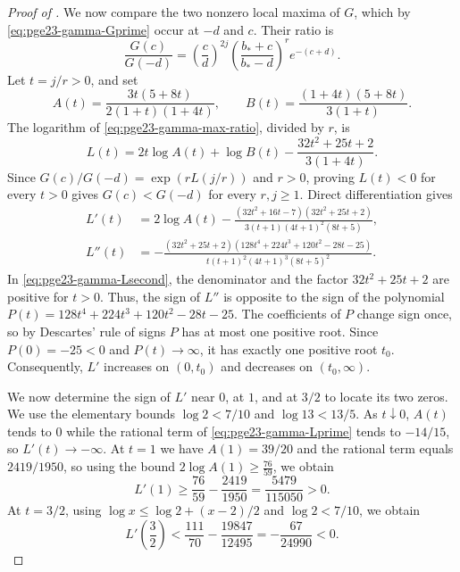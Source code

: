 \documentclass[11pt]{article}
\theoremstyle{remark}
\numberwithin{equation}{section}
\begin{document}
\begin{proof}[Proof of ]
  We now compare the two nonzero local maxima of $G$, which by
  \eqref{eq:pge23-gamma-Gprime} occur at $-d$ and $c$.
  Their ratio is
  \begin{equation}\label{eq:pge23-gamma-max-ratio}
    \frac{G(c)}{G(-d)}
    =\left(\frac {c}{d}\right)^{2j}
    \left(\frac{b_*+c}{b_*-d}\right)^r e^{-(c+d)}.
  \end{equation}
  Let $t=j/r>0$, and set
  \[
    A(t)=\frac{3t(5+8t)}{2(1+t)(1+4t)},
    \qquad
    B(t)=\frac{(1+4t)(5+8t)}{3(1+t)}.
  \]
  The logarithm of \eqref{eq:pge23-gamma-max-ratio}, divided by $r$, is
  \[
    L(t)=2t\log A(t)+\log B(t)
      -\frac{32t^2+25t+2}{3(1+4t)}.
  \]
  Since $G(c)/G(-d)=\exp(rL(j/r))$ and $r>0$, proving $L(t)<0$
  for every $t>0$ gives $G(c)<G(-d)$ for every $r,j\ge1$.
  Direct differentiation gives
  \begin{align}
    L'(t)
    &=2\log A(t)
    -\frac{(32t^2+16t-7)(32t^2+25t+2)}
    {3(t+1)(4t+1)^2(8t+5)},\label{eq:pge23-gamma-Lprime}\\
    L''(t)
    &=-\frac{(32t^2+25t+2)
    (128t^4+224t^3+120t^2-28t-25)}
    {t(t+1)^2(4t+1)^3(8t+5)^2}.
    \label{eq:pge23-gamma-Lsecond}
  \end{align}
  In \eqref{eq:pge23-gamma-Lsecond}, the denominator and the factor
  $32t^2+25t+2$ are positive for $t>0$. Thus, the sign of $L''$ is opposite to the sign of the polynomial
  $P(t)=128t^4+224t^3+120t^2-28t-25$.
  The coefficients of $P$ change sign once, so by Descartes' rule of signs $P$ has at most one positive root.
  Since $P(0)=-25<0$ and $P(t)\to\infty$, it has exactly one positive
  root $t_0$. Consequently, $L'$ increases on $(0,t_0)$ and decreases on
  $(t_0,\infty)$.

  We now determine the sign of $L'$ near $0$, at $1$, and at $3/2$
  to locate its two zeros.
  We use the elementary bounds $\log2<7/10$ and $\log13<13/5$.
  As $t\downarrow0$, $A(t)$ tends to $0$ while the rational term of \eqref{eq:pge23-gamma-Lprime} tends to $-14/15$, so $L'(t)\to-\infty$.
  At $t=1$ we have $A(1)=39/20$ and the rational term equals $2419/1950$, so using the bound $2\log A(1)\ge\frac{76}{59}$, we obtain
  \[
    L'(1)\ge\frac{76}{59}-\frac{2419}{1950}
    =\frac{5479}{115050}>0.
  \]
  At $t=3/2$, using $\log x\le\log2+(x-2)/2$ and $\log2<7/10$,
  we obtain
  \[
    L'\left(\frac{3}{2}\right)
    <\frac{111}{70}-\frac{19847}{12495}
    =-\frac{67}{24990}<0.
  \]


\end{proof}
\end{document}
